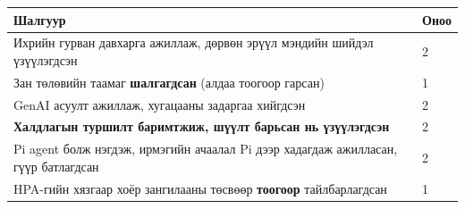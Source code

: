 \begingroup\scriptsize\begin{longtable}[]{@{}ll@{}}
\toprule
\begin{minipage}[b]{0.47\columnwidth}\raggedright
Шалгуур\strut
\end{minipage} & \begin{minipage}[b]{0.47\columnwidth}\raggedright
Оноо\strut
\end{minipage}\tabularnewline
\midrule
\endhead
\begin{minipage}[t]{0.47\columnwidth}\raggedright
Ихрийн гурван давхарга ажиллаж, дөрвөн эрүүл мэндийн шийдэл үзүүлэгдсэн\strut
\end{minipage} & \begin{minipage}[t]{0.47\columnwidth}\raggedright
2\strut
\end{minipage}\tabularnewline
\begin{minipage}[t]{0.47\columnwidth}\raggedright
Зан төлөвийн таамаг \textbf{шалгагдсан} (алдаа тоогоор гарсан)\strut
\end{minipage} & \begin{minipage}[t]{0.47\columnwidth}\raggedright
1\strut
\end{minipage}\tabularnewline
\begin{minipage}[t]{0.47\columnwidth}\raggedright
GenAI асуулт ажиллаж, хугацааны задаргаа хийгдсэн\strut
\end{minipage} & \begin{minipage}[t]{0.47\columnwidth}\raggedright
2\strut
\end{minipage}\tabularnewline
\begin{minipage}[t]{0.47\columnwidth}\raggedright
\textbf{Халдлагын туршилт баримтжиж, шүүлт барьсан нь үзүүлэгдсэн}\strut
\end{minipage} & \begin{minipage}[t]{0.47\columnwidth}\raggedright
2\strut
\end{minipage}\tabularnewline
\begin{minipage}[t]{0.47\columnwidth}\raggedright
Pi agent болж нэгдэж, ирмэгийн ачаалал Pi дээр хадагдаж ажилласан, гүүр батлагдсан\strut
\end{minipage} & \begin{minipage}[t]{0.47\columnwidth}\raggedright
2\strut
\end{minipage}\tabularnewline
\begin{minipage}[t]{0.47\columnwidth}\raggedright
HPA-гийн хязгаар хоёр зангилааны төсвөөр \textbf{тоогоор} тайлбарлагдсан\strut
\end{minipage} & \begin{minipage}[t]{0.47\columnwidth}\raggedright
1\strut
\end{minipage}\tabularnewline
\bottomrule
\end{longtable}\endgroup

